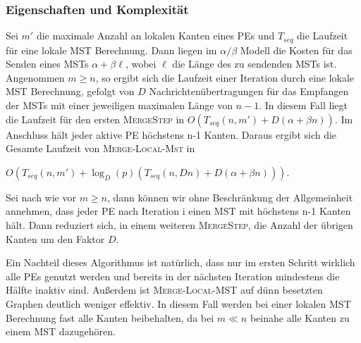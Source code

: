 \subsubsection{Eigenschaften und Komplexität}
Sei $m'$ die maximale Anzahl an lokalen Kanten eines PEs und $T_{seq}$ die Laufzeit für eine lokale MST Berechnung.
Dann liegen im $\alpha/\beta$ Modell die Kosten für das Senden eines MSTs $\alpha + \beta \ell$, wobei $\ell$ die Länge des zu sendenden MSTs ist.  Angenommen $m \geq n$, so ergibt sich die Laufzeit einer Iteration durch eine lokale MST Berechnung, gefolgt von $D$ Nachrichtenübertragungen für das Empfangen der MSTs mit einer jeweiligen maximalen Länge von $n-1$. In diesem Fall liegt die Laufzeit für den ersten \textsc{MergeStep} in  $O(T_{seq}(n,m') + D(\alpha +\beta n))$. 
Im Anschluss hält jeder aktive PE höchstens n-1 Kanten. Daraus ergibt sich die Gesamte Laufzeit von \textsc{Merge-Local-Mst} in 
\begin{center}
    $O(T_{seq}(n,m') +
    \log_{D}(p) (T_{seq}(n,Dn) + D(\alpha +\beta n)))$.
\end{center}

Sei nach wie vor $m \geq n$, dann können wir ohne Beschränkung der Allgemeinheit annehmen, dass jeder PE nach Iteration i einen MST mit höchstens n-1 Kanten hält. Dann reduziert sich, in einem weiteren \textsc{MergeStep}, die Anzahl der übrigen Kanten um den Faktor $D$.

Ein Nachteil dieses Algorithmus ist natürlich, dass nur im ersten Schritt wirklich alle PEs genutzt werden und bereits in der nächsten Iteration mindestens die Hälfte inaktiv sind.
Außerdem ist \textsc{Merge-Local-MST} auf dünn besetzten Graphen deutlich weniger effektiv. In diesem Fall werden bei einer lokalen MST Berechnung fast alle Kanten beibehalten, da bei $m \ll n$ beinahe alle Kanten zu einem MST dazugehören.

